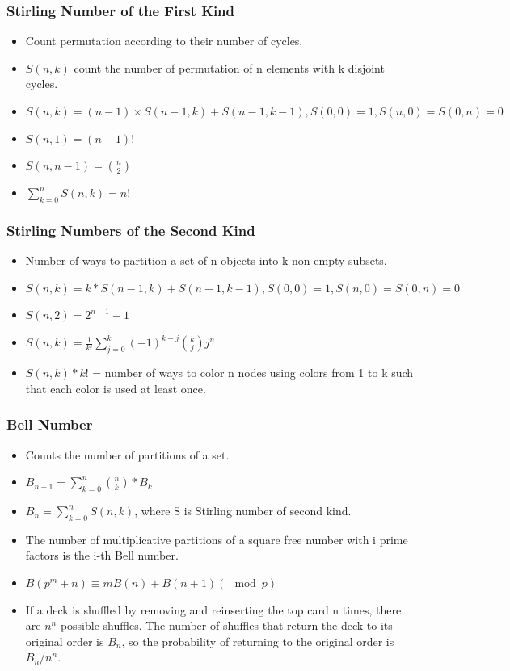 \subsubsection{Stirling Number of the First Kind}
\vspace{2.5mm}
\begin{itemize}
    \item Count permutation according to their number of cycles.
    \item $S(n,k)$ count the number of permutation of n elements with k disjoint cycles.
    \item $S(n,k) = (n-1) \times S(n-1,k) + S(n-1, k-1), S(0,0) = 1, S(n,0) = S(0,n) = 0$
    \item $S(n,1) = (n-1)!$
    \item $S(n,n-1) = \binom{n}{2}$
    \item $\sum_{k=0}^n S(n,k) = n!$
\end{itemize}

\subsubsection{Stirling Numbers of the Second Kind}
\vspace{2.5mm}
\begin{itemize}
    \item Number of ways to partition a set of n objects into k non-empty subsets.
    \item $S(n,k) = k*S(n-1,k)+S(n-1,k-1), S(0,0) = 1, S(n,0) = S(0,n) = 0$
    \item $S(n,2) = 2^{n-1}-1$
    \item $S(n,k) = \frac{1}{k!}\sum\limits_{j=0}^{k}(-1)^{k-j}\binom{k}{j}j^n$

    \item $S(n,k)*k!$ = number of ways to color n nodes using colors from 1 to k such that each color is used at least once.
\end{itemize}
\subsubsection{Bell Number}
\vspace{2.5mm}
\begin{itemize}
    \item Counts the number of partitions of a set.
    \item $B_{n+1} = \sum_{k=0}^n \binom{n}{k}*B_k$
    \item $B_n = \sum_{k=0}^n S(n,k)$, where S is Stirling number of second kind.
    \item The number of multiplicative partitions of a square free number with i prime
          factors is the i-th Bell number.
    \item $B(p^m+n) \equiv mB(n)+B(n+1) (\mod p)$
    \item If a deck is shuffled by removing and reinserting the top card n times, there
          are $n^n$ possible shuffles. The number of shuffles that return the deck to its
          original order is $B_n$, so the probability of returning to the original order
          is $B_n/n^n$.
\end{itemize}
